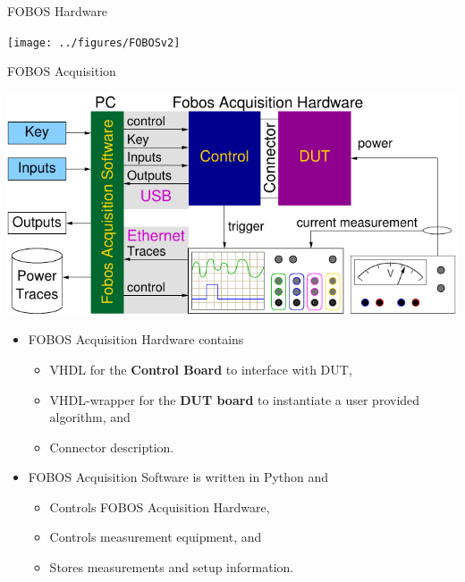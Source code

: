 \documentclass[xcolor=pdftex,dvipsnames,table,final]{beamer}
\begin{document}
\begin{frame}[fragile]{}
\begin{columns}[t]
\begin{column}{.31\linewidth}
      \begin{block}{FOBOS Hardware}
        \vspace{-1ex}
        \begin{center}
          \texttt{[image: ../figures/FOBOSv2]}
        \end{center} 
        \vspace{-0.2ex}
       \end{block}

      \begin{block}{FOBOS Acquisition}
        \begin{center}
          \includegraphics[scale=1.7]{../figures/fobos-dac}
        \end{center} 

          \begin{itemize}
            \item FOBOS Acquisition Hardware contains 
            \begin{itemize}
              \item VHDL for the \textbf{Control Board} to interface with DUT,
              \item VHDL-wrapper for the \textbf{DUT board} to instantiate a user provided algorithm, and
              \item Connector description.
            \end{itemize}
            \item FOBOS Acquisition Software is written in Python and 
            \begin{itemize}
              \item Controls FOBOS Acquisition Hardware,
              \item Controls measurement equipment, and
              \item Stores measurements and setup information.
            \end{itemize}
          \end{itemize}
       \end{block}
     

\end{column}
\end{columns}
\end{frame}
\end{document}
